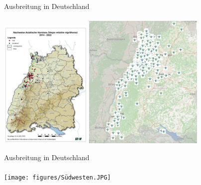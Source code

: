 \documentclass[aspectratio=169]{beamer}
\begin{document}
\begin{frame}{Ausbreitung in Deutschland}
	\framesubtitle{}

			\includegraphics[width=0.33\textwidth]{figures/Asiatische Hornisse Verbreitung 2014-2022_900x1272.jpg}
			\includegraphics[width=0.43\textwidth]{figures/Screenshot 2024-03-06 at 11-21-52 Asiatische Hornisse Fundortkarte - LUBW.png}
\end{frame}


\begin{frame}{Ausbreitung in Deutschland}
	\framesubtitle{}

			\texttt{[image: figures/Südwesten.JPG]}

\end{frame}
\end{document}
